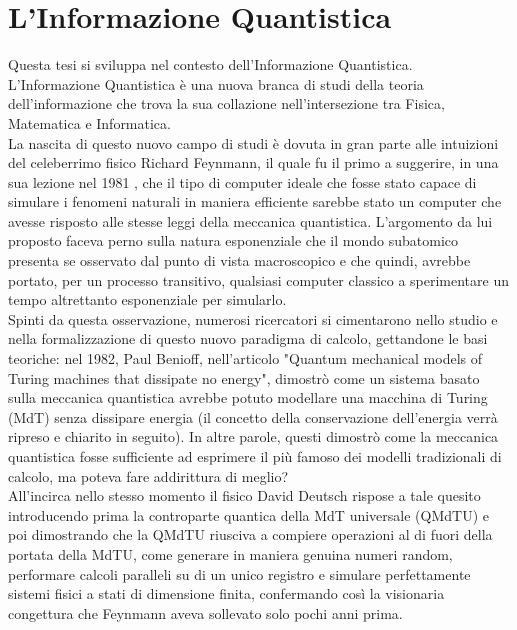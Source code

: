 \documentclass[12pt,a4paper,openright]{report}
\begin{document}
\chapter{L'Informazione Quantistica}
Questa tesi si sviluppa nel contesto dell'Informazione Quantistica.\\
L'Informazione Quantistica è una nuova branca di studi della teoria dell'informazione che trova la sua collazione nell'intersezione tra
Fisica, Matematica e Informatica.\\
La nascita di questo nuovo campo di studi è dovuta in gran parte alle intuizioni del celeberrimo fisico Richard Feynmann, il quale fu il primo a suggerire,
in una sua lezione nel 1981 \cite{ref6}, che il tipo di computer ideale che fosse stato capace di simulare i fenomeni naturali in maniera
efficiente sarebbe stato un computer che avesse risposto alle stesse leggi della meccanica quantistica. L'argomento da lui proposto faceva
perno sulla natura esponenziale che il mondo subatomico presenta se osservato dal punto di vista macroscopico e che quindi, avrebbe portato,
per un processo transitivo, qualsiasi computer classico a sperimentare un tempo altrettanto esponenziale per simularlo.\\
Spinti da questa osservazione, numerosi ricercatori si cimentarono nello studio e nella formalizzazione di questo nuovo paradigma di calcolo,
gettandone le basi teoriche: nel 1982, Paul Benioff, nell'articolo "Quantum mechanical models of Turing machines that dissipate no energy"\cite{ref7}, 
dimostrò come un sistema basato sulla meccanica quantistica avrebbe potuto modellare una macchina di Turing (MdT) senza dissipare energia (il concetto della conservazione dell'energia 
verrà ripreso e chiarito in seguito). In altre parole, questi dimostrò come la meccanica quantistica fosse sufficiente ad esprimere il più
famoso dei modelli tradizionali di calcolo, ma poteva fare addirittura di meglio? \\
All'incirca nello stesso momento il fisico David Deutsch rispose a tale quesito introducendo prima la controparte quantica della MdT universale (QMdTU)
e poi dimostrando che la QMdTU riusciva a compiere operazioni al di fuori della portata della MdTU, come generare in maniera genuina numeri random,
performare calcoli paralleli su di un unico registro e simulare perfettamente sistemi fisici a stati di dimensione finita, confermando così
la visionaria congettura che Feynmann aveva sollevato solo pochi anni prima.  
\end{document}
